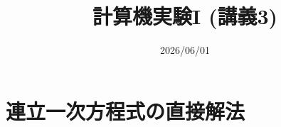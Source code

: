 \documentclass[10pt,dvipdfmx]{beamer}
\title{計算機実験I (講義3)}
\date{2026/06/01}
\begin{document}
\begin{frame}
  \titlepage
  \tableofcontents
\end{frame}





\section{連立一次方程式の直接解法}









%
%


%





















\section{}

\end{document}
